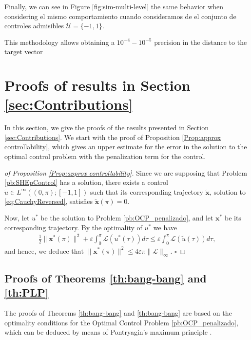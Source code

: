 \documentclass[twocolumn]{autart}    %
\begin{document}
Finally, we can see in Figure \ref{fig:sim-multi-level} the same behavior when considering el mismo comportamiento cuando consideramos de el conjunto de controles admisibles $\mathcal{U} = \{-1,1\}$.
 
This methodology allows obtaining a $10^{-4}-10^{-5}$ precision in the distance to the target vector

\section{Proofs of results in Section \ref{sec:Contributions}}\label{sec:Proof}

In this section, we give the proofs of the results presented in Section \ref{sec:Contributions}. We start with the proof of Proposition \ref{Prop:approx controllability}, which gives an upper estimate for the error in the solution to the optimal control problem with the penalization term for the control. 

\bigskip

\begin{proof}[of Proposition \ref{Prop:approx controllability}]
Since we are supposing that Problem \ref{pb:SHEpControl} has a solution, there exists a control $\tilde{u}\in L^\infty((0,\pi); [-1,1])$ such that its corresponding trajectory $\tilde{\bm{x}}$, solution to \eqref{eq:CauchyReversed}, satisfies $\tilde{\bm{x}}(\pi) = 0$. 

Now, let $u^\ast$ be the solution to Problem \ref{pb:OCP_penalizado}, and let $\bm{x}^\ast$ be its corresponding trajectory. By the optimality of $u^\ast$ we have
\begin{align*}
	\frac{1}{2} \| \bm{x}^\ast(\pi)\|^2 +\varepsilon \int_0^\pi \mathcal{L}(u^\ast(\tau))d\tau \leq \varepsilon \int_0^\pi \mathcal{L}(\tilde{u}(\tau))d\tau,
\end{align*}
and hence, we deduce that $\| \bm{x}^\ast (\pi)\|^2 \leq 4 \varepsilon \pi \| \mathcal{L}\|_\infty.$ \hfill $\square$
\end{proof}

\subsection{Proofs of Theorems \ref{th:bang-bang} and \ref{th:PLP}}

The proofs of Theorems \ref{th:bang-bang} and \ref{th:bang-bang} are based on the optimality conditions for the Optimal Control Problem \ref{pb:OCP_penalizado}, which can be deduced by means of Pontryagin's maximum principle \cite[Chapter~2.7]{bryson1975applied}.
\end{document}
